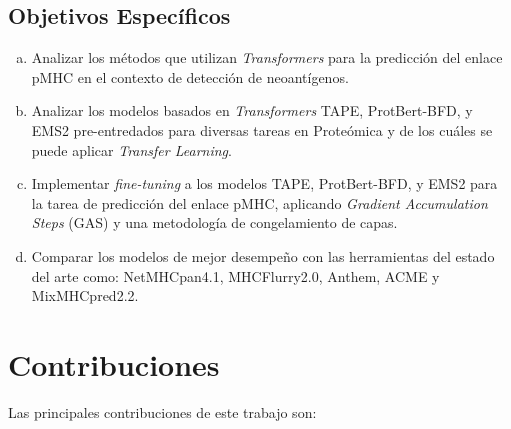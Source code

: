 \subsection{Objetivos Específicos}

\begin{enumerate}[(a)]
	\item Analizar los métodos que utilizan \textit{Transformers} para la predicción del enlace pMHC en el contexto de detección de neoantígenos.
	\item Analizar los modelos basados en \textit{Transformers} TAPE, ProtBert-BFD, y EMS2 pre-entredados para diversas tareas en Proteómica y de los cuáles se puede aplicar \textit{Transfer Learning}. 	
	\item Implementar \textit{fine-tuning} a los modelos TAPE, ProtBert-BFD, y EMS2 para la tarea de predicción del enlace pMHC, aplicando \textit{Gradient Accumulation Steps} (GAS) y una metodología de congelamiento de capas.
	\item Comparar los modelos de mejor desempeño con las herramientas del estado del arte como: NetMHCpan4.1, MHCFlurry2.0, Anthem, ACME y MixMHCpred2.2.
\end{enumerate}

\section{Contribuciones}
\label{sec:contribuciones}
Las principales contribuciones de este trabajo son:

